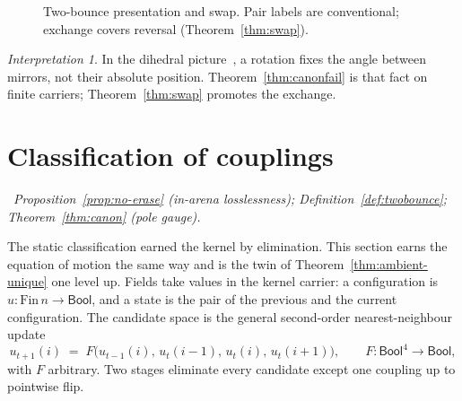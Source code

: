 \documentclass[11pt,a4paper]{article}
\theoremstyle{plain}
\theoremstyle{definition}
\theoremstyle{remark}
\newtheorem{interpretation}[theorem]{Interpretation}
\newcommand{\Bool}{\mathsf{Bool}}
\newcommand{\comp}{\circ}
\newcommand{\dep}[1]{%
  \par\noindent{\small\color{muted}\sffamily Dependence:}~\textit{#1}\par\medskip}
\begin{document}
\Needspace{12em}
\begin{figure}[ht]
\centering
{}
\caption{Two-bounce presentation and swap. Pair labels are conventional;
exchange covers reversal (Theorem~\ref{thm:swap}).}
\label{fig:bounce}
\end{figure}

\begin{interpretation}
\label{int:mirrors}
In the dihedral picture~\cite{dihedral}, a rotation fixes the angle
between mirrors, not their absolute position. Theorem~\ref{thm:canonfail} is that fact on
finite carriers; Theorem~\ref{thm:swap} promotes the exchange.
\end{interpretation}


\section{Classification of couplings}
\label{sec:coupling}

\dep{Proposition~\ref{prop:no-erase} (in-arena losslessness);
Definition~\ref{def:twobounce}; Theorem~\ref{thm:canon} (pole gauge).}

The static classification earned the kernel by elimination. This
section earns the equation of motion the same way and is the twin of
Theorem~\ref{thm:ambient-unique} one level up. Fields take values in
the kernel carrier: a configuration is $u:\mathrm{Fin}\,n\to\Bool$, and
a state is the pair of the previous and the current configuration. The
candidate space is the general second-order nearest-neighbour update
\[
  u_{t+1}(i) \;=\; F\bigl(u_{t-1}(i),\,u_t(i{-}1),\,u_t(i),\,u_t(i{+}1)\bigr),
  \qquad F:\Bool^4\to\Bool,
\]
with $F$ arbitrary. Two stages eliminate every candidate except one
coupling up to pointwise flip.
\end{document}
